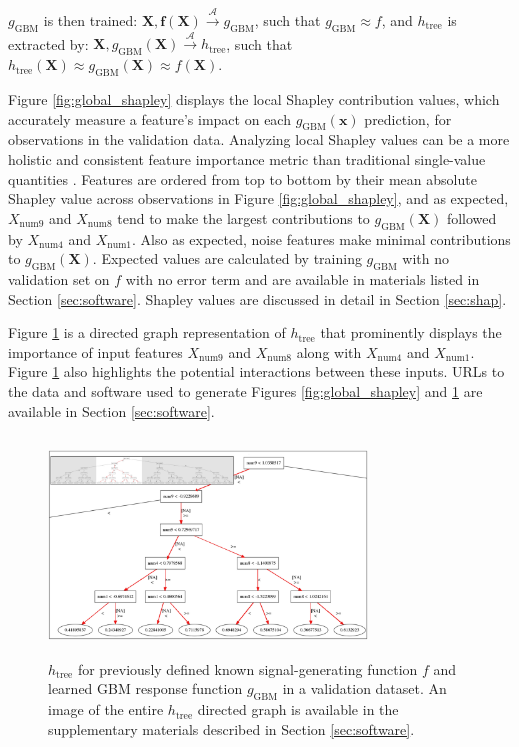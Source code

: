 \documentclass[sigconf]{acmart}
\begin{document}
$g_{\text{GBM}}$ is then trained: $ \mathbf{X}, \mathbf{f(X)} \xrightarrow{\mathcal{A}} g_{\text{GBM}}$, such that $g_{\text{GBM}} \approx f$, and $h_{\text{tree}}$ is extracted by: $\mathbf{X}, g_{\text{GBM}}(\mathbf{X}) \xrightarrow{\mathcal{A}} h_{\text{tree}}$,  such that\\ $h_{\text{tree}}(\mathbf{X}) \approx g_{\text{GBM}}(\mathbf{X}) \approx f(\mathbf{X})$.

Figure \ref{fig:global_shapley} displays the local Shapley contribution values, which accurately measure a feature's impact on each $g_{\text{GBM}}(\mathbf{x})$ prediction, for observations in the validation data. Analyzing local Shapley values can be a more holistic and consistent feature importance metric than traditional single-value quantities \cite{shapley}. Features are ordered from top to bottom by their mean absolute Shapley value across observations in Figure \ref{fig:global_shapley}, and as expected, $X_{\text{num}9}$ and $X_{\text{num}8}$ tend to make the largest contributions to $g_{\text{GBM}}(\mathbf{X})$ followed by $X_{\text{num}4}$ and $X_{\text{num}1}$. Also as expected, noise features make minimal contributions to $g_{\text{GBM}}(\mathbf{X})$. Expected values are calculated by training $g_{\text{GBM}}$ with no validation set on $f$ with no error term and are available in materials listed in Section \ref{sec:software}. Shapley values are discussed in detail in Section \ref{sec:shap}. 

Figure \ref{fig:dt_surrogate} is a directed graph representation of $h_{\text{tree}}$ that prominently displays the importance of input features $X_{\text{num}9}$ and $X_{\text{num}8}$ along with $X_{\text{num}4}$ and $X_{\text{num}1}$. Figure \ref{fig:dt_surrogate} also highlights the potential interactions between these inputs. URLs to the data and software used to generate Figures \ref{fig:global_shapley} and \ref{fig:dt_surrogate} are available in Section \ref{sec:software}.

\begin{figure}[htb]
	\begin{center}
		\includegraphics[height=165pt, width=240pt]{img/figure_3-eps-converted-to.pdf}
		\caption{$h_{\text{tree}}$ for previously defined known signal-generating function $f$ and learned GBM response function $g_{\text{GBM}}$ in a validation dataset. An image of the entire $h_{\text{tree}}$ directed graph is available in the supplementary materials described in Section \ref{sec:software}.}
		\label{fig:dt_surrogate}
	\end{center}
\end{figure}
\end{document}
